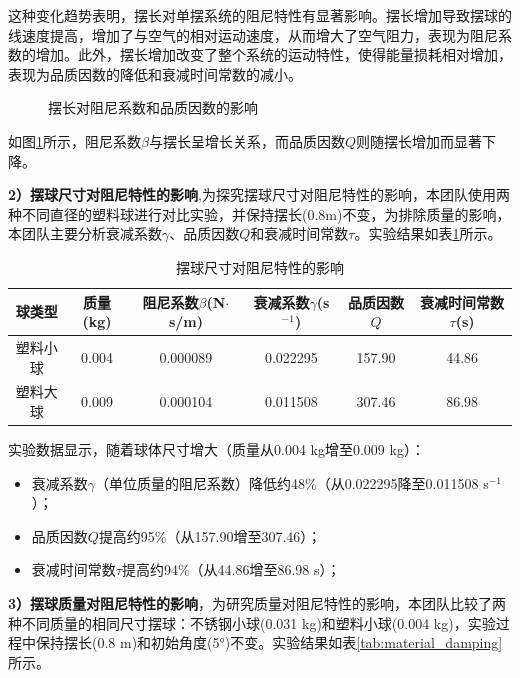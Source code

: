 这种变化趋势表明，摆长对单摆系统的阻尼特性有显著影响。摆长增加导致摆球的线速度提高，增加了与空气的相对运动速度，从而增大了空气阻力，表现为阻尼系数的增加。此外，摆长增加改变了整个系统的运动特性，使得能量损耗相对增加，表现为品质因数的降低和衰减时间常数的减小。

\begin{figure}[H]
    \centering
    \subfigure[摆长对阻尼系数的影响]{
        
        \label{fig:length_damping_coef}
    }
    \subfigure[摆长对品质因数的影响]{
        
        \label{fig:length_quality_factor}
    }
    \caption{摆长对阻尼系数和品质因数的影响}
    \label{fig:length_damping}
\end{figure}

如图\ref{fig:length_damping}所示，阻尼系数$\beta$与摆长呈增长关系，而品质因数$Q$则随摆长增加而显著下降。

\textbf{2）摆球尺寸对阻尼特性的影响},为探究摆球尺寸对阻尼特性的影响，本团队使用两种不同直径的塑料球进行对比实验，并保持摆长(0.8m)不变，为排除质量的影响，本团队主要分析衰减系数$\gamma$、品质因数$Q$和衰减时间常数$\tau$。实验结果如表\ref{tab:size_damping}所示。

\begin{table}[H]
\centering
\caption{摆球尺寸对阻尼特性的影响}
\begin{tabular}{c c c c c c@{}}
\toprule
\textbf{球类型} & \textbf{质量(kg)} & \textbf{阻尼系数$\beta$(N$\cdot$s/m)} & \textbf{衰减系数$\gamma$(s$^{-1}$)} & \textbf{品质因数$Q$} & \textbf{衰减时间常数$\tau$(s)} \\
\midrule
塑料小球 & 0.004 & 0.000089 & 0.022295 & 157.90 & 44.86 \\
塑料大球 & 0.009 & 0.000104 & 0.011508 & 307.46 & 86.98 \\
\bottomrule
\end{tabular}
\label{tab:size_damping}
\end{table}

实验数据显示，随着球体尺寸增大（质量从0.004 kg增至0.009 kg）：
\begin{itemize}
  \item 衰减系数$\gamma$（单位质量的阻尼系数）降低约48\%（从0.022295降至0.011508 s$^{-1}$）；
  \item 品质因数$Q$提高约95\%（从157.90增至307.46）；
  \item 衰减时间常数$\tau$提高约94\%（从44.86增至86.98 s）；
\end{itemize}

\textbf{3）摆球质量对阻尼特性的影响}，为研究质量对阻尼特性的影响，本团队比较了两种不同质量的相同尺寸摆球：不锈钢小球(0.031 kg)和塑料小球(0.004 kg)，实验过程中保持摆长(0.8 m)和初始角度(5°)不变。实验结果如表\ref{tab:material_damping}所示。

